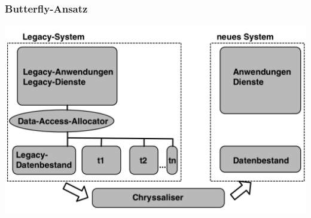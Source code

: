 \documentclass{beamer}
\begin{document}
	\begin{frame}
		\frametitle{Butterfly-Ansatz}
	
		
		\centering
		\includegraphics[width=\textwidth]{../images/Butterfly.png} \\

		
	\end{frame}
	
\end{document}
